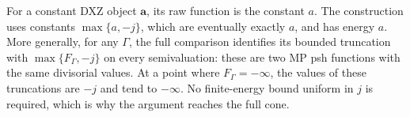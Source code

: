 \begin{example}\label{ex:p143k-truncation-order}
For a constant DXZ object \(\mathbf a\), its raw function is the
constant \(a\). The construction uses constants \(\max\{a,-j\}\),
which are eventually exactly \(a\), and has energy \(a\).
More generally, for any \(\Gamma\), the full comparison identifies its
bounded truncation with \(\max\{F_\Gamma,-j\}\) on every semivaluation:
these are two MP psh functions with the same divisorial values.
At a point where \(F_\Gamma=-\infty\), the values of these truncations
are \(-j\) and tend to \(-\infty\). No finite-energy bound uniform in
\(j\) is required, which is why the argument reaches the full cone.
\end{example}

